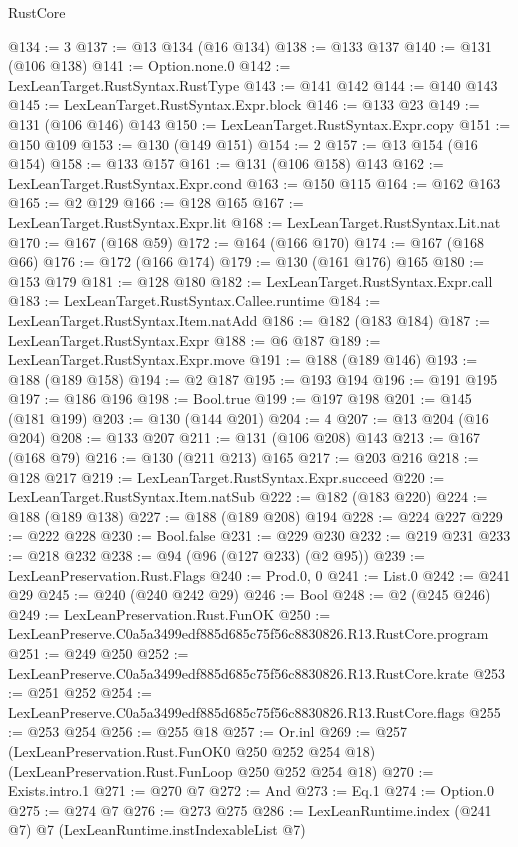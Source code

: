 \begin{lexlean}{RustCore}
\begin{coremodule}
@134 := 3
@137 := @13 @134 (@16 @134)
@138 := @133 @137
@140 := @131 (@106 @138)
@141 := Option.none.{0}
@142 := LexLeanTarget.RustSyntax.RustType
@143 := @141 @142
@144 := @140 @143
@145 := LexLeanTarget.RustSyntax.Expr.block
@146 := @133 @23
@149 := @131 (@106 @146) @143
@150 := LexLeanTarget.RustSyntax.Expr.copy
@151 := @150 @109
@153 := @130 (@149 @151)
@154 := 2
@157 := @13 @154 (@16 @154)
@158 := @133 @157
@161 := @131 (@106 @158) @143
@162 := LexLeanTarget.RustSyntax.Expr.cond
@163 := @150 @115
@164 := @162 @163
@165 := @2 @129
@166 := @128 @165
@167 := LexLeanTarget.RustSyntax.Expr.lit
@168 := LexLeanTarget.RustSyntax.Lit.nat
@170 := @167 (@168 @59)
@172 := @164 (@166 @170)
@174 := @167 (@168 @66)
@176 := @172 (@166 @174)
@179 := @130 (@161 @176) @165
@180 := @153 @179
@181 := @128 @180
@182 := LexLeanTarget.RustSyntax.Expr.call
@183 := LexLeanTarget.RustSyntax.Callee.runtime
@184 := LexLeanTarget.RustSyntax.Item.natAdd
@186 := @182 (@183 @184)
@187 := LexLeanTarget.RustSyntax.Expr
@188 := @6 @187
@189 := LexLeanTarget.RustSyntax.Expr.move
@191 := @188 (@189 @146)
@193 := @188 (@189 @158)
@194 := @2 @187
@195 := @193 @194
@196 := @191 @195
@197 := @186 @196
@198 := Bool.true
@199 := @197 @198
@201 := @145 (@181 @199)
@203 := @130 (@144 @201)
@204 := 4
@207 := @13 @204 (@16 @204)
@208 := @133 @207
@211 := @131 (@106 @208) @143
@213 := @167 (@168 @79)
@216 := @130 (@211 @213) @165
@217 := @203 @216
@218 := @128 @217
@219 := LexLeanTarget.RustSyntax.Expr.succeed
@220 := LexLeanTarget.RustSyntax.Item.natSub
@222 := @182 (@183 @220)
@224 := @188 (@189 @138)
@227 := @188 (@189 @208) @194
@228 := @224 @227
@229 := @222 @228
@230 := Bool.false
@231 := @229 @230
@232 := @219 @231
@233 := @218 @232
@238 := @94 (@96 (@127 @233) (@2 @95))
@239 := LexLeanPreservation.Rust.Flags
@240 := Prod.{0, 0}
@241 := List.{0}
@242 := @241 @29
@245 := @240 (@240 @242 @29)
@246 := Bool
@248 := @2 (@245 @246)
@249 := LexLeanPreservation.Rust.FunOK
@250 := LexLeanPreserve.C0a5a3499edf885d685c75f56c8830826.R13.RustCore.program
@251 := @249 @250
@252 := LexLeanPreserve.C0a5a3499edf885d685c75f56c8830826.R13.RustCore.krate
@253 := @251 @252
@254 := LexLeanPreserve.C0a5a3499edf885d685c75f56c8830826.R13.RustCore.flags
@255 := @253 @254
@256 := @255 @18
@257 := Or.inl
@269 := @257
    (LexLeanPreservation.Rust.FunOK0 @250 @252 @254 @18)
    (LexLeanPreservation.Rust.FunLoop @250 @252 @254 @18)
@270 := Exists.intro.{1}
@271 := @270 @7
@272 := And
@273 := Eq.{1}
@274 := Option.{0}
@275 := @274 @7
@276 := @273 @275
@286 := LexLeanRuntime.index
    (@241 @7)
    @7
    (LexLeanRuntime.instIndexableList @7)

\end{coremodule}
\end{lexlean}
